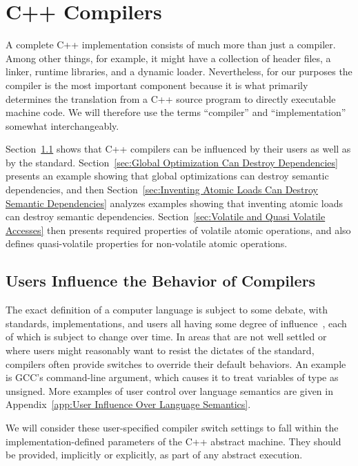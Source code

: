 \documentclass[10]{article}
\begin{document}
\section{C++ Compilers}
\label{sec:C++ Compilers}

A complete C++ implementation consists of much more than just a compiler.
Among other things, for example, it might have a collection of
 header files, a linker, runtime libraries, and a dynamic loader.
Nevertheless, for our purposes the compiler is the most important
component because it is what primarily determines the translation from
a C++ source program to directly executable machine code.
We will therefore use the terms ``compiler'' and ``implementation''
somewhat interchangeably.

Section~\ref{sec:Users Influence the Behavior of Compilers}
shows that C++ compilers can be influenced by their users as well
as by the standard.
Section~\ref{sec:Global Optimization Can Destroy Dependencies}
presents an example showing that global optimizations can destroy
semantic dependencies, and then
Section~\ref{sec:Inventing Atomic Loads Can Destroy Semantic Dependencies}
analyzes examples showing that inventing atomic loads can destroy
semantic dependencies.
Section~\ref{sec:Volatile and Quasi Volatile Accesses}
then presents required properties of volatile atomic operations, and
also defines quasi-volatile properties for non-volatile atomic operations.

\subsection{Users Influence the Behavior of Compilers}
\label{sec:Users Influence the Behavior of Compilers}

The exact definition of a computer language is subject to some debate,
with standards, implementations, and users all having some degree of
influence~\cite{KayvanMemarian2016DepthOfC-1,KayvanMemarian2016DepthOfC-2},
each of which is subject to change over time.
In areas that are not well settled or where users might reasonably
want to resist the dictates of the standard,
compilers often provide switches to override their default behaviors.
An example is GCC's  command-line argument,
which causes it to treat variables of type  as unsigned.
More examples of user control over language semantics are given in
Appendix~\ref{app:User Influence Over Language Semantics}.

We will consider these user-specified compiler switch settings to fall
within the implementation-defined parameters of the C++ abstract machine.
They should be provided, implicitly or explicitly, as part of any
abstract execution.
\end{document}
